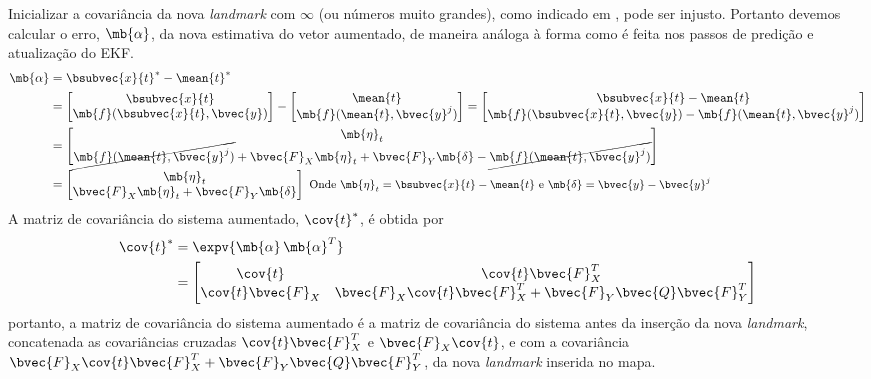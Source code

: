 Inicializar a covariância da nova \textit{landmark} com $\infty$ (ou 
números muito grandes), como indicado em 
\cite[p.~317]{bongard2006probabilistic}, pode ser injusto. Portanto devemos 
calcular o erro, $\mb{\alpha}$, da nova estimativa do vetor aumentado, de 
maneira análoga à forma como é feita nos passos de predição e atualização 
do EKF. 
\begin{equation}
\begin{aligned}
   \mb{\alpha} &= \bsubvec{x}{t}^* - \mean{t}^*\\
   &= \begin{bmatrix}
       \bsubvec{x}{t} \\ \mb{f}(\bsubvec{x}{t}, \bvec{y})
   \end{bmatrix} - \begin{bmatrix}
       \mean{t} \\ \mb{f}(\mean{t}, \bvec{y}^j)
   \end{bmatrix} = \begin{bmatrix}
       \bsubvec{x}{t} - \mean{t}\\
       \mb{f}(\bsubvec{x}{t}, \bvec{y}) - \mb{f}(\mean{t}, \bvec{y}^j)
   \end{bmatrix}\\
   &= \begin{bmatrix}
       \mb{\eta}_t \\
       \cancel{\mb{f}(\mean{t}, \bvec{y}^j)} + 
       \bvec{F}_X \mb{\eta}_t + \bvec{F}_Y \mb{\delta}
       - \cancel{\mb{f}(\mean{t}, \bvec{y}^j)}
   \end{bmatrix} \\
    &= \begin{bmatrix}
       \mb{\eta}_t \\
       \bvec{F}_X \mb{\eta}_t + \bvec{F}_Y \mb{\delta} 
   \end{bmatrix} \small\text{ Onde $\mb{\eta}_t = \bsubvec{x}{t} - \mean{t}$ e $\mb{\delta} = \bvec{y} - \bvec{y}^j$}
\end{aligned}
\end{equation}
A matriz de covariância do sistema aumentado, $\cov{t}^*$, é obtida por
\renewcommand{\arraystretch}{1.5}
\begin{equation}
\begin{aligned}
  \cov{t}^* &= \expv{\mb{\alpha} \,\mb{\alpha}^T} \\
  &= \begin{bmatrix}
       \cov{t} & \cov{t} \bvec{F}_X^T\\
       \cov{t} \bvec{F}_X &  \bvec{F}_X \cov{t} \bvec{F}_X^T 
       + \bvec{F}_Y \bvec{Q} \bvec{F}_Y^T
    \end{bmatrix}
\end{aligned}
\end{equation}
\renewcommand{\arraystretch}{1}
portanto, a matriz de covariância do sistema aumentado é a matriz de 
covariância do sistema antes da inserção da nova \textit{landmark}, 
concatenada as covariâncias cruzadas $\cov{t} \bvec{F}_X^T$ e $\bvec{F}_X \cov{t}$, e com a covariância $\bvec{F}_X \cov{t} \bvec{F}_X^T + \bvec{F}_Y 
\bvec{Q} \bvec{F}_Y^T$, da nova \textit{landmark} inserida no mapa. 

